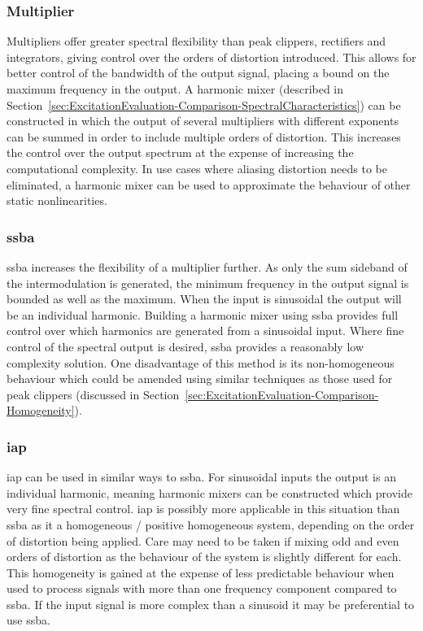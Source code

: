 		\subsubsection*{Multiplier}
			Multipliers offer greater spectral flexibility than peak clippers, rectifiers and integrators,
			giving control over the orders of distortion introduced. This allows for better control of the
			bandwidth of the output signal, placing a bound on the maximum frequency in the output. A harmonic
			mixer (described in Section~\ref{sec:ExcitationEvaluation-Comparison-SpectralCharacteristics}) can
			be constructed in which the output of several multipliers with different exponents can be summed in
			order to include multiple orders of distortion. This increases the control over the output spectrum
			at the expense of increasing the computational complexity. In use cases where aliasing distortion
			needs to be eliminated, a harmonic mixer can be used to approximate the behaviour of other static
			nonlinearities.

		\subsubsection*{\acrshort{ssba}}
			\acrshort{ssba} increases the flexibility of a multiplier further. As only the sum sideband of the
			intermodulation is generated, the minimum frequency in the output signal is bounded as well as the
			maximum. When the input is sinusoidal the output will be an individual harmonic. Building a
			harmonic mixer using \acrshort{ssba} provides full control over which harmonics are generated from
			a sinusoidal input. Where fine control of the spectral output is desired, \acrshort{ssba} provides
			a reasonably low complexity solution. One disadvantage of this method is its non-homogeneous
			behaviour which could be amended using similar techniques as those used for peak clippers
			(discussed in Section~\ref{sec:ExcitationEvaluation-Comparison-Homogeneity}).

		\subsubsection*{\acrshort{iap}}
			\acrshort{iap} can be used in similar ways to \acrshort{ssba}. For sinusoidal inputs the output is
			an individual harmonic, meaning harmonic mixers can be constructed which provide very fine spectral
			control. \acrshort{iap} is possibly more applicable in this situation than \acrshort{ssba} as it a
			homogeneous / positive homogeneous system, depending on the order of distortion being applied. Care
			may need to be taken if mixing odd and even orders of distortion as the behaviour of the system is
			slightly different for each. This homogeneity is gained at the expense of less predictable
			behaviour when used to process signals with more than one frequency component compared to
			\acrshort{ssba}. If the input signal is more complex than a sinusoid it may be preferential to use
			\acrshort{ssba}.

